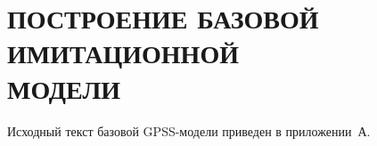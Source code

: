 \section[Построение базовой имитационной модели]{
  ПОСТРОЕНИЕ БАЗОВОЙ ИМИТАЦИОННОЙ \\ 
  МОДЕЛИ}

Исходный текст базовой GPSS-модели приведен в приложении~А.